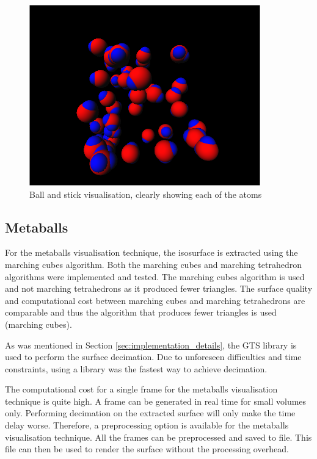 \begin{figure}[h!]
  \begin{center}
    \includegraphics[width=100mm]{ballstick}
  \end{center}
  \caption{Ball and stick visualisation, clearly showing each of the atoms}
  \label{fig:implementation_ballstick}
\end{figure}


\subsection{Metaballs}
\label{sub:implementation_metaballs}

For the metaballs visualisation technique, the isosurface is extracted using
the marching cubes algorithm. Both the marching cubes and marching tetrahedron
algorithms were implemented and tested. The marching cubes algorithm is used
and not marching tetrahedrons as it produced fewer triangles. The surface
quality and computational cost between marching cubes and marching tetrahedrons
are comparable and thus the algorithm that produces fewer triangles is used
(marching cubes).

As was mentioned in Section \ref{sec:implementation_details}, the GTS library
is used to perform the surface decimation. Due to unforeseen difficulties and
time constraints, using a library was the fastest way to achieve decimation.

The computational cost for a single frame for the metaballs visualisation
technique is quite high. A frame can be generated in real time for small
volumes only. Performing decimation on the extracted surface will only make the
time delay worse. Therefore, a preprocessing option is available for the
metaballs visualisation technique. All the frames can be preprocessed and saved
to file. This file can then be used to render the surface without the
processing overhead.

